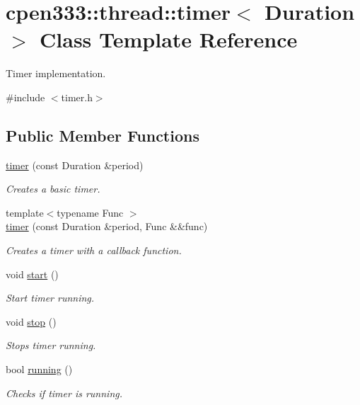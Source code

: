 \hypertarget{classcpen333_1_1thread_1_1timer}{}\section{cpen333\+:\+:thread\+:\+:timer$<$ Duration $>$ Class Template Reference}
\label{classcpen333_1_1thread_1_1timer}


Timer implementation.  




{\ttfamily \#include $<$timer.\+h$>$}

\subsection*{Public Member Functions}
\begin{DoxyCompactItemize}
\item 
\hyperlink{classcpen333_1_1thread_1_1timer_adf189ddfc276e7efa2c49ac9413627b9}{timer} (const Duration \&period)
\begin{DoxyCompactList}\small\item\em Creates a basic timer. \end{DoxyCompactList}\item 
{\footnotesize template$<$typename Func $>$ }\\\hyperlink{classcpen333_1_1thread_1_1timer_a8eb8ec006064a7eed1f63d1ae2c74acd}{timer} (const Duration \&period, Func \&\&func)
\begin{DoxyCompactList}\small\item\em Creates a timer with a callback function. \end{DoxyCompactList}\item 
void \hyperlink{classcpen333_1_1thread_1_1timer_a0d1be90402f46912966ec5fc13707bce}{start} ()
\begin{DoxyCompactList}\small\item\em Start timer running. \end{DoxyCompactList}\item 
void \hyperlink{classcpen333_1_1thread_1_1timer_afa3811e04ef58d3040935c49aca19948}{stop} ()
\begin{DoxyCompactList}\small\item\em Stops timer running. \end{DoxyCompactList}\item 
bool \hyperlink{classcpen333_1_1thread_1_1timer_a339ef2ea452a86d83a0f41c7d4e255b0}{running} ()
\begin{DoxyCompactList}\small\item\em Checks if timer is running. \end{DoxyCompactList}\item 

\end{DoxyCompactItemize}
